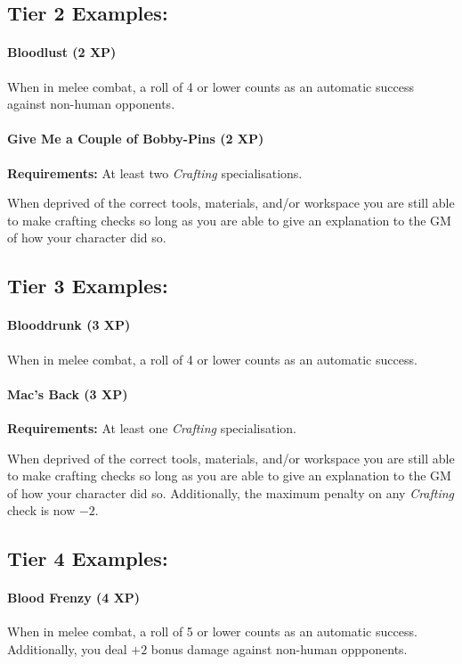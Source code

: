 \subsection{Tier 2 Examples:}
\paragraph{Bloodlust (2 XP)}
When in melee combat, a roll of 4 or lower counts as an automatic success against non-human opponents.

\paragraph{Give Me a Couple of Bobby-Pins (2 XP)}
\textbf{Requirements:} At least two \textit{Crafting} specialisations.

When deprived of the correct tools, materials, and/or workspace you are still able to make crafting checks so long as you are able to give an explanation to the GM of how your character did so.

\subsection{Tier 3 Examples:}
\paragraph{Blooddrunk (3 XP)}
When in melee combat, a roll of 4 or lower counts as an automatic success.

\paragraph{Mac's Back (3 XP)}
\textbf{Requirements:} At least one \textit{Crafting} specialisation.

When deprived of the correct tools, materials, and/or workspace you are still able to make crafting checks so long as you are able to give an explanation to the GM of how your character did so.
Additionally, the maximum penalty on any \textit{Crafting} check is now $-2$.

\subsection{Tier 4 Examples:}

\paragraph{Blood Frenzy (4 XP)}
When in melee combat, a roll of 5 or lower counts as an automatic success.
Additionally, you deal $+2$ bonus damage against non-human oppponents.

